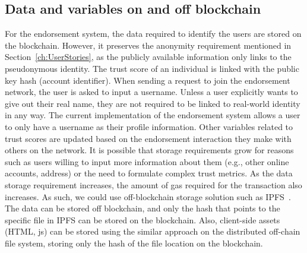 \subsection{Data and variables on and off blockchain} \label{subsec:datablockchain}
For the endorsement system, the data required to identify the users are stored
on the blockchain. However, it preserves the anonymity requirement mentioned in
Section~\ref{ch:UserStories}, as the publicly available information only links
to the pseudonymous identity. The trust score of an individual is linked with
the public key hash (account identifier). When sending a request to join the
endorsement network, the user is asked to input a username. Unless a user
explicitly wants to give out their real name, they are not required to be
linked to real-world identity in any way. The current implementation of the
endorsement system allows a user to only have a username as their profile
information. Other variables related to trust scores are updated based on the
endorsement interaction they make with others on the network. It is possible
that storage requirements grow for reasons such as users willing to input more
information about them (e.g., other online accounts, address) or the need to
formulate complex trust metrics. As the data storage requirement increases, the
amount of gas required for the transaction also increases. As such, we could
use off-blockchain storage solution such as IPFS~\cite{benet2014ipfs}.  The
data can be stored off blockchain, and only the hash that points to the
specific file in IPFS can be stored on the blockchain. Also, client-side assets
(HTML, js) can be stored using the similar approach on the distributed
off-chain file system, storing only the hash of the file location on the
blockchain. 

